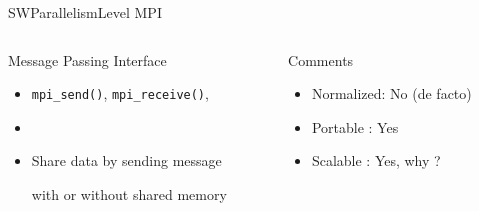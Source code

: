 %
\begin{Frame}{SWParallelismLevel MPI}
  \begin{columns}[t]
    \begin{column}{5cm} %
      \begin{block}{Message Passing Interface}
        \begin{itemize}
        \item \texttt{mpi\_send()}, \texttt{mpi\_receive()}, 
        \item
        \item Share data by sending message

          with or without shared memory
        \end{itemize}
      \end{block} 
    \end{column}
    
    \begin{column}{5cm} %
      \begin{alertblock}{Comments}
        \begin{itemize}
        \item Normalized: No (de facto)
        \item Portable : Yes
        \item Scalable : Yes, why ?
        \end{itemize}
      \end{alertblock}   
    \end{column}
  \end{columns}  
\end{Frame}


